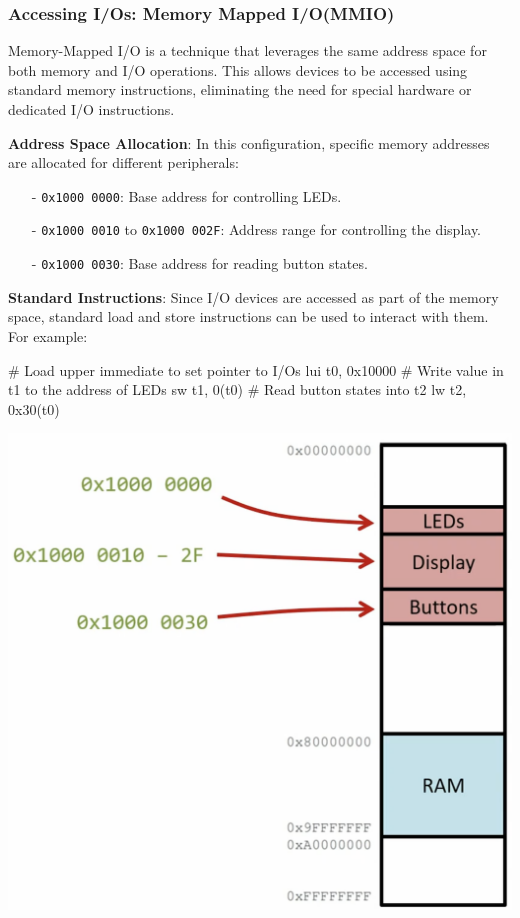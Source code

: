 \subsubsection{Accessing I/Os: Memory Mapped I/O(MMIO)}
Memory-Mapped I/O is a technique that leverages the same address space for both memory and I/O operations. This allows devices to be accessed using standard memory instructions, eliminating the need for special hardware or dedicated I/O instructions. \\
\begin{minipage}[htp]{0.5\textwidth}
\textbf{Address Space Allocation}: In this configuration, specific memory addresses are allocated for different peripherals:
\begin{itemize}
\item[-] \texttt{0x1000\ 0000}: Base address for controlling LEDs.
\item[-] \texttt{0x1000\ 0010} to \texttt{0x1000\ 002F}: Address range for controlling the display.
\item[-] \texttt{0x1000\ 0030}: Base address for reading button states.
\end{itemize}
\textbf{Standard Instructions}: Since I/O devices are accessed as part of the memory space, standard load and store instructions can be used to interact with them. For example:
\begin{assembly}
# Load upper immediate to set pointer to I/Os
lui   t0, 0x10000    
# Write value in t1 to the address of LEDs    
sw    t1, 0(t0)          
# Read button states into t2
lw    t2, 0x30(t0)       
\end{assembly}
\end{minipage}
\hfill
\vline
\hfill
\begin{minipage}[htp]{0.45\textwidth}
    \begin{center}
        \includegraphics[width=1\textwidth]{chapters/chapter2b/images/io_memory.png}
    \end{center}
\end{minipage}\\
\vspace{5px}


